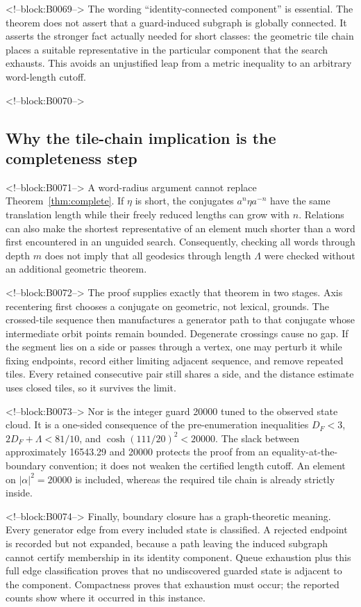 \documentclass[11pt,a4paper]{article}
\theoremstyle{definition}
\begin{document}
<!--block:B0069-->
The wording ``identity-connected component'' is essential.  The theorem does
not assert that a guard-induced subgraph is globally connected.  It asserts
the stronger fact actually needed for short classes: the geometric tile
chain places a suitable representative in the particular component that the
search exhausts.  This avoids an unjustified leap from a metric inequality to
an arbitrary word-length cutoff.

<!--block:B0070-->
\subsection{Why the tile-chain implication is the completeness step}

<!--block:B0071-->
A word-radius argument cannot replace Theorem~\ref{thm:complete}.  If
\(\eta\) is short, the conjugates \(a^n\eta a^{-n}\) have the same translation
length while their freely reduced lengths can grow with \(n\).  Relations can
also make the shortest representative of an element much shorter than a word
first encountered in an unguided search.  Consequently, checking all words
through depth \(m\) does not imply that all geodesics through length
\(\Lambda\) were checked without an additional geometric theorem.

<!--block:B0072-->
The proof supplies exactly that theorem in two stages.  Axis recentering first
chooses a conjugate on geometric, not lexical, grounds.  The crossed-tile
sequence then manufactures a generator path to that conjugate whose
intermediate orbit points remain bounded.  Degenerate crossings cause no
gap.  If the segment lies on a side or passes through a vertex, one may
perturb it while fixing endpoints, record either limiting adjacent sequence,
and remove repeated tiles.  Every retained consecutive pair still shares a
side, and the distance estimate uses closed tiles, so it survives the limit.

<!--block:B0073-->
Nor is the integer guard 20000 tuned to the observed state cloud.  It is a
one-sided consequence of the pre-enumeration inequalities
\(D_F<3\), \(2D_F+\Lambda<81/10\), and
\(\cosh(111/20)^2<20000\).  The slack between approximately 16543.29 and
20000 protects the proof from an equality-at-the-boundary convention; it does
not weaken the certified length cutoff.  An element on
\(|\alpha|^2=20000\) is included, whereas the required tile chain is already
strictly inside.

<!--block:B0074-->
Finally, boundary closure has a graph-theoretic meaning.  Every generator edge
from every included state is classified.  A rejected endpoint is recorded but
not expanded, because a path leaving the induced subgraph cannot certify
membership in its identity component.  Queue exhaustion plus this full edge
classification proves that no undiscovered guarded state is adjacent to the
component.  Compactness proves that exhaustion must occur; the reported counts
show where it occurred in this instance.
\end{document}
